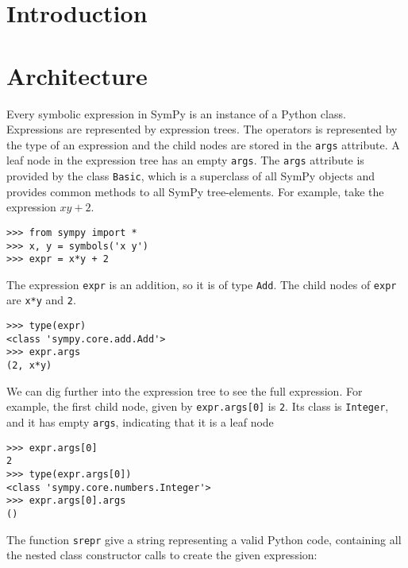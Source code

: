 \documentclass{article}
\begin{document}
\section{Introduction}


\section{Architecture}


Every symbolic expression in SymPy is an instance of a Python class.
Expressions are represented by expression trees. The operators is represented
by the type of an expression and the child nodes are stored in the
\texttt{args} attribute. A leaf node in the expression tree has an empty
\texttt{args}.
The \texttt{args} attribute is provided by the class \texttt{Basic},
which is a superclass of all SymPy objects and
provides common methods to all SymPy tree-elements.
For example, take the expression $xy + 2$.

\begin{verbatim}
>>> from sympy import *
>>> x, y = symbols('x y')
>>> expr = x*y + 2
\end{verbatim}

The expression \texttt{expr} is an addition, so it is of type \texttt{Add}. The child
nodes of \texttt{expr} are \texttt{x*y} and \texttt{2}.

\begin{verbatim}
>>> type(expr)
<class 'sympy.core.add.Add'>
>>> expr.args
(2, x*y)
\end{verbatim}

We can dig further into the expression tree to see the full expression. For
example, the first child node, given by \texttt{expr.args[0]} is
\texttt{2}. Its class is \texttt{Integer}, and it has empty \texttt{args},
indicating that it is a leaf node

\begin{verbatim}
>>> expr.args[0]
2
>>> type(expr.args[0])
<class 'sympy.core.numbers.Integer'>
>>> expr.args[0].args
()
\end{verbatim}

The function \texttt{srepr} give a string representing a valid Python code,
containing all the nested class constructor calls to create the given expression:
\end{document}
